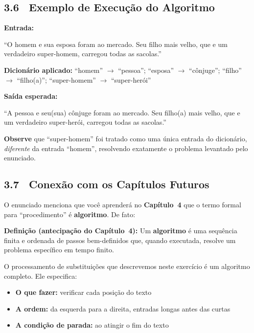 \documentclass[12pt,a4paper]{article}
\begin{document}
\bigskip

\subsection*{3.6 \ Exemplo de Execução do Algoritmo}

\textbf{Entrada:}

\begin{tcolorbox}[colback=black!10, colframe=deitelblue, fontupper=\small]
``O homem e sua esposa foram ao mercado. Seu filho mais velho, que e um
verdadeiro super-homem, carregou todas as sacolas.''
\end{tcolorbox}

\textbf{Dicionário aplicado:}
``homem'' $\to$ ``pessoa''; \; ``esposa'' $\to$ ``cônjuge''; \;
``filho'' $\to$ ``filho(a)''; \; ``super-homem'' $\to$ ``super-herói''

\textbf{Saída esperada:}

\begin{tcolorbox}[colback=black!10, colframe=ecogreen, fontupper=\small]
``A pessoa e seu(sua) cônjuge foram ao mercado. Seu filho(a) mais velho, que e um
verdadeiro super-herói, carregou todas as sacolas.''
\end{tcolorbox}

\textbf{Observe} que ``super-homem'' foi tratado como uma única entrada do dicionário,
\textit{diferente} da entrada ``homem'', resolvendo exatamente o problema levantado
pelo enunciado.

\bigskip

\subsection*{3.7 \ Conexão com os Capítulos Futuros}

O enunciado menciona que você aprenderá no \textbf{Capítulo~4} que o termo formal
para ``procedimento'' é \textbf{algoritmo}. De fato:

\begin{tcolorbox}[colback=deitellightblue, colframe=deitelblue]
\textbf{Definição (antecipação do Capítulo~4):} Um \textbf{algoritmo} é uma sequência
finita e ordenada de passos bem-definidos que, quando executada, resolve um problema
específico em tempo finito.
\end{tcolorbox}

O processamento de substituições que descrevemos neste exercício é um algoritmo completo.
Ele especifica:
\begin{itemize}
  \item \textbf{O que fazer:} verificar cada posição do texto
  \item \textbf{A ordem:} da esquerda para a direita, entradas longas antes das curtas
  \item \textbf{A condição de parada:} ao atingir o fim do texto
\end{itemize}
\end{document}
